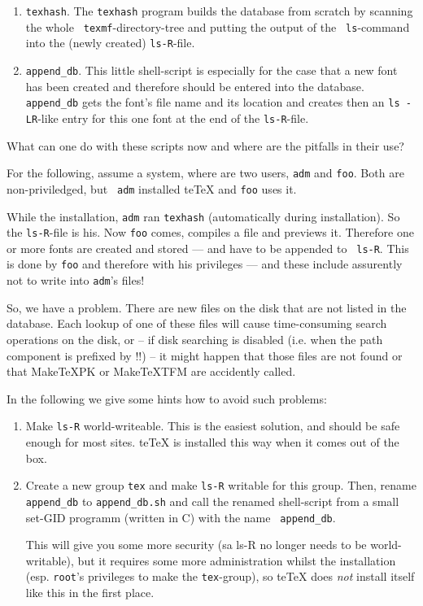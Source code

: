 \documentclass[12pt,a4paper]{article}
\newcommand{\teTeX}{\textrm{te}\TeX\xspace}
\begin{document}
\begin{enumerate}
\item {\tt texhash}. The {\tt texhash} program builds the
  database from scratch by scanning the whole {\tt
    texmf}-directory-tree and putting the output of the {\tt
    ls}-command into the (newly created) {\tt ls-R}-file.
  
\item {\tt append\_db}. This little shell-script is
  especially for the case that a new font has been created
  and therefore should be entered into the database. {\tt
    append\_db} gets the font's file name and its location
  and creates then an {\tt ls -LR}-like entry for this one
  font at the end of the {\tt ls-R}-file.
\end{enumerate}

What can one do with these scripts now and where are the
pitfalls in their use?

For the following, assume a system, where are two users,
{\tt adm} and {\tt foo}. Both are non-priviledged, but {\tt
  adm} installed \teTeX{} and {\tt foo} uses it.

While the installation, {\tt adm} ran {\tt texhash} (automatically
during installation). So the {\tt ls-R}-file is his. Now
{\tt foo} comes, compiles a file and previews it. Therefore one or
more fonts are created and stored --- and have to be appended to {\tt
  ls-R}. This is done by {\tt foo} and therefore with his privileges
--- and these include assurently not to write into {\tt adm}'s
files!

So, we have a problem. There are new files on the disk that
are not listed in the database. Each lookup of one of these
files will cause time-consuming search operations on the
disk, or -- if disk searching is disabled (i.e. when the
path component is prefixed by !!)  -- it might happen that
those files are not found or that MakeTeXPK or MakeTeXTFM
are accidently called.

In the following we give some hints how to avoid such
problems:

\begin{enumerate}
  
\item Make {\tt ls-R} world-writeable. This is the easiest
  solution, and should be safe enough for most sites.
  \teTeX{} is installed this way when it comes out of the
  box.
  
\item Create a new group {\tt tex} and make {\tt ls-R}
  writable for this group. Then, rename {\tt append\_db} to
  {\tt append\_db.sh} and call the renamed shell-script from
  a small set-GID programm (written in C) with the name {\tt
    append\_db}.
  
  This will give you some more security (sa ls-R no longer
  needs to be world-writable), but it requires some more
  administration whilst the installation (esp. {\tt root}'s
  privileges to make the {\tt tex}-group), so \teTeX{} does
  \emph{not} install itself like this in the first place.
\end{enumerate}
\end{document}
